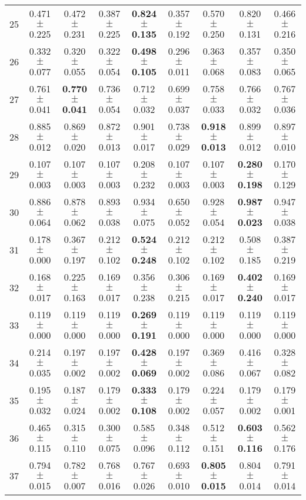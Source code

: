 \begin{table}[!ht]
{\begin{tabular}{r c c c c c c c c}
25 & 0.471 $\pm$ 0.225 & 0.472 $\pm$ 0.231 & 0.387 $\pm$ 0.225 & \textbf{0.824 $\pm$ 0.135} & 0.357 $\pm$ 0.192 & 0.570 $\pm$ 0.250 & 0.820 $\pm$ 0.131 & 0.466 $\pm$ 0.216 \\
26 & 0.332 $\pm$ 0.077 & 0.320 $\pm$ 0.055 & 0.322 $\pm$ 0.054 & \textbf{0.498 $\pm$ 0.105} & 0.296 $\pm$ 0.011 & 0.363 $\pm$ 0.068 & 0.357 $\pm$ 0.083 & 0.350 $\pm$ 0.065 \\
27 & 0.761 $\pm$ 0.041 & \textbf{0.770 $\pm$ 0.041} & 0.736 $\pm$ 0.054 & 0.712 $\pm$ 0.032 & 0.699 $\pm$ 0.037 & 0.758 $\pm$ 0.033 & 0.766 $\pm$ 0.032 & 0.767 $\pm$ 0.036 \\
28 & 0.885 $\pm$ 0.012 & 0.869 $\pm$ 0.020 & 0.872 $\pm$ 0.013 & 0.901 $\pm$ 0.017 & 0.738 $\pm$ 0.029 & \textbf{0.918 $\pm$ 0.013} & 0.899 $\pm$ 0.012 & 0.897 $\pm$ 0.010 \\
29 & 0.107 $\pm$ 0.003 & 0.107 $\pm$ 0.003 & 0.107 $\pm$ 0.003 & 0.208 $\pm$ 0.232 & 0.107 $\pm$ 0.003 & 0.107 $\pm$ 0.003 & \textbf{0.280 $\pm$ 0.198} & 0.170 $\pm$ 0.129 \\
30 & 0.886 $\pm$ 0.064 & 0.878 $\pm$ 0.062 & 0.893 $\pm$ 0.038 & 0.934 $\pm$ 0.075 & 0.650 $\pm$ 0.052 & 0.928 $\pm$ 0.054 & \textbf{0.987 $\pm$ 0.023} & 0.947 $\pm$ 0.038 \\
31 & 0.178 $\pm$ 0.000 & 0.367 $\pm$ 0.197 & 0.212 $\pm$ 0.102 & \textbf{0.524 $\pm$ 0.248} & 0.212 $\pm$ 0.102 & 0.212 $\pm$ 0.102 & 0.508 $\pm$ 0.185 & 0.387 $\pm$ 0.219 \\
32 & 0.168 $\pm$ 0.017 & 0.225 $\pm$ 0.163 & 0.169 $\pm$ 0.017 & 0.356 $\pm$ 0.238 & 0.306 $\pm$ 0.215 & 0.169 $\pm$ 0.017 & \textbf{0.402 $\pm$ 0.240} & 0.169 $\pm$ 0.017 \\
33 & 0.119 $\pm$ 0.000 & 0.119 $\pm$ 0.000 & 0.119 $\pm$ 0.000 & \textbf{0.269 $\pm$ 0.191} & 0.119 $\pm$ 0.000 & 0.119 $\pm$ 0.000 & 0.119 $\pm$ 0.000 & 0.119 $\pm$ 0.000 \\
34 & 0.214 $\pm$ 0.035 & 0.197 $\pm$ 0.002 & 0.197 $\pm$ 0.002 & \textbf{0.428 $\pm$ 0.069} & 0.197 $\pm$ 0.002 & 0.369 $\pm$ 0.086 & 0.416 $\pm$ 0.067 & 0.328 $\pm$ 0.082 \\
35 & 0.195 $\pm$ 0.032 & 0.187 $\pm$ 0.024 & 0.179 $\pm$ 0.002 & \textbf{0.333 $\pm$ 0.108} & 0.179 $\pm$ 0.002 & 0.224 $\pm$ 0.057 & 0.179 $\pm$ 0.002 & 0.179 $\pm$ 0.001 \\
36 & 0.465 $\pm$ 0.115 & 0.315 $\pm$ 0.110 & 0.300 $\pm$ 0.075 & 0.585 $\pm$ 0.096 & 0.348 $\pm$ 0.112 & 0.512 $\pm$ 0.151 & \textbf{0.603 $\pm$ 0.116} & 0.562 $\pm$ 0.176 \\
37 & 0.794 $\pm$ 0.015 & 0.782 $\pm$ 0.007 & 0.768 $\pm$ 0.016 & 0.767 $\pm$ 0.026 & 0.693 $\pm$ 0.010 & \textbf{0.805 $\pm$ 0.015} & 0.804 $\pm$ 0.014 & 0.791 $\pm$ 0.014 \\

\end{tabular}}
\end{table}

